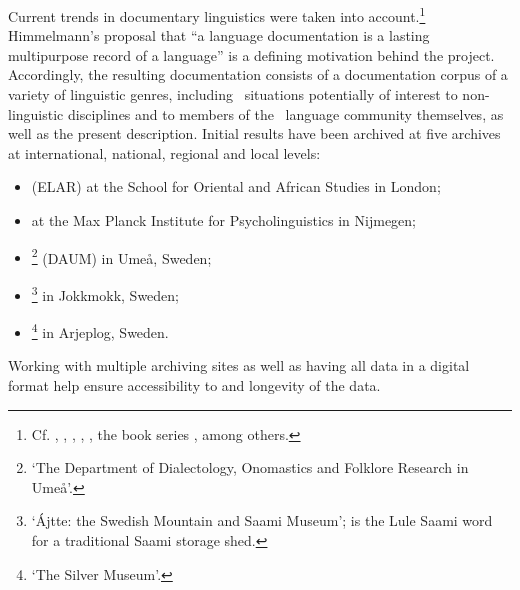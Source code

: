 Current trends in documentary linguistics were taken into account.\footnote{Cf. \citet{BirdSimons2003}, \citet{Gippert2006}, \citet{Woodbury2011}, \citet{AustinSallabank2011}, \citet{GrenobleFurbee2010}, the book series , among others.} 
Himmelmann’s proposal that “a language documentation is a lasting multipurpose record of a language” \citep[1]{Himmelmann2006a} is a defining motivation behind the project. Accordingly, the resulting documentation consists of a documentation corpus of a variety of linguistic genres, including \PS\ situations potentially of interest to non-linguistic disciplines and to members of the \PS\ language community themselves, as well as the present description. Initial results have been archived at five archives at international, national, regional and local levels:
\begin{itemize}
\item{ (ELAR) at the School for Oriental and African Studies in London;}
\item{ at the Max Planck Institute for Psycholinguistics in Nijmegen;}
\item{\footnote{‘The Department of Dialectology, Onomastics and Folklore Research in Umeå’.} (DAUM) in Umeå, Sweden;}
\item{\footnote{‘Ájtte: the Swedish Mountain and Saami Museum’;  is the Lule Saami word for a traditional Saami storage shed.} in Jokkmokk, Sweden;}
\item{\footnote{‘The Silver Museum’.} in Arjeplog, Sweden.}
\end{itemize}
Working with multiple archiving sites as well as having all data in a digital format help ensure accessibility to and longevity of the data. 

